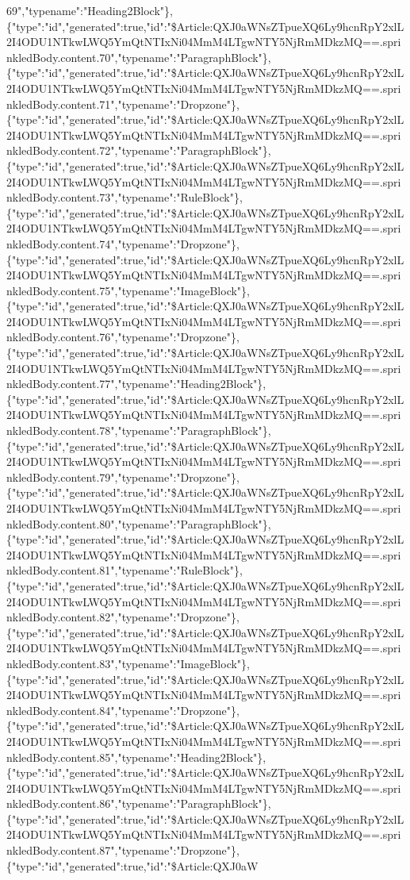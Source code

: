 69","typename":"Heading2Block"\},\{"type":"id","generated":true,"id":"\$Article:QXJ0aWNsZTpueXQ6Ly9hcnRpY2xlL2I4ODU1NTkwLWQ5YmQtNTIxNi04MmM4LTgwNTY5NjRmMDkzMQ==.sprinkledBody.content.70","typename":"ParagraphBlock"\},\{"type":"id","generated":true,"id":"\$Article:QXJ0aWNsZTpueXQ6Ly9hcnRpY2xlL2I4ODU1NTkwLWQ5YmQtNTIxNi04MmM4LTgwNTY5NjRmMDkzMQ==.sprinkledBody.content.71","typename":"Dropzone"\},\{"type":"id","generated":true,"id":"\$Article:QXJ0aWNsZTpueXQ6Ly9hcnRpY2xlL2I4ODU1NTkwLWQ5YmQtNTIxNi04MmM4LTgwNTY5NjRmMDkzMQ==.sprinkledBody.content.72","typename":"ParagraphBlock"\},\{"type":"id","generated":true,"id":"\$Article:QXJ0aWNsZTpueXQ6Ly9hcnRpY2xlL2I4ODU1NTkwLWQ5YmQtNTIxNi04MmM4LTgwNTY5NjRmMDkzMQ==.sprinkledBody.content.73","typename":"RuleBlock"\},\{"type":"id","generated":true,"id":"\$Article:QXJ0aWNsZTpueXQ6Ly9hcnRpY2xlL2I4ODU1NTkwLWQ5YmQtNTIxNi04MmM4LTgwNTY5NjRmMDkzMQ==.sprinkledBody.content.74","typename":"Dropzone"\},\{"type":"id","generated":true,"id":"\$Article:QXJ0aWNsZTpueXQ6Ly9hcnRpY2xlL2I4ODU1NTkwLWQ5YmQtNTIxNi04MmM4LTgwNTY5NjRmMDkzMQ==.sprinkledBody.content.75","typename":"ImageBlock"\},\{"type":"id","generated":true,"id":"\$Article:QXJ0aWNsZTpueXQ6Ly9hcnRpY2xlL2I4ODU1NTkwLWQ5YmQtNTIxNi04MmM4LTgwNTY5NjRmMDkzMQ==.sprinkledBody.content.76","typename":"Dropzone"\},\{"type":"id","generated":true,"id":"\$Article:QXJ0aWNsZTpueXQ6Ly9hcnRpY2xlL2I4ODU1NTkwLWQ5YmQtNTIxNi04MmM4LTgwNTY5NjRmMDkzMQ==.sprinkledBody.content.77","typename":"Heading2Block"\},\{"type":"id","generated":true,"id":"\$Article:QXJ0aWNsZTpueXQ6Ly9hcnRpY2xlL2I4ODU1NTkwLWQ5YmQtNTIxNi04MmM4LTgwNTY5NjRmMDkzMQ==.sprinkledBody.content.78","typename":"ParagraphBlock"\},\{"type":"id","generated":true,"id":"\$Article:QXJ0aWNsZTpueXQ6Ly9hcnRpY2xlL2I4ODU1NTkwLWQ5YmQtNTIxNi04MmM4LTgwNTY5NjRmMDkzMQ==.sprinkledBody.content.79","typename":"Dropzone"\},\{"type":"id","generated":true,"id":"\$Article:QXJ0aWNsZTpueXQ6Ly9hcnRpY2xlL2I4ODU1NTkwLWQ5YmQtNTIxNi04MmM4LTgwNTY5NjRmMDkzMQ==.sprinkledBody.content.80","typename":"ParagraphBlock"\},\{"type":"id","generated":true,"id":"\$Article:QXJ0aWNsZTpueXQ6Ly9hcnRpY2xlL2I4ODU1NTkwLWQ5YmQtNTIxNi04MmM4LTgwNTY5NjRmMDkzMQ==.sprinkledBody.content.81","typename":"RuleBlock"\},\{"type":"id","generated":true,"id":"\$Article:QXJ0aWNsZTpueXQ6Ly9hcnRpY2xlL2I4ODU1NTkwLWQ5YmQtNTIxNi04MmM4LTgwNTY5NjRmMDkzMQ==.sprinkledBody.content.82","typename":"Dropzone"\},\{"type":"id","generated":true,"id":"\$Article:QXJ0aWNsZTpueXQ6Ly9hcnRpY2xlL2I4ODU1NTkwLWQ5YmQtNTIxNi04MmM4LTgwNTY5NjRmMDkzMQ==.sprinkledBody.content.83","typename":"ImageBlock"\},\{"type":"id","generated":true,"id":"\$Article:QXJ0aWNsZTpueXQ6Ly9hcnRpY2xlL2I4ODU1NTkwLWQ5YmQtNTIxNi04MmM4LTgwNTY5NjRmMDkzMQ==.sprinkledBody.content.84","typename":"Dropzone"\},\{"type":"id","generated":true,"id":"\$Article:QXJ0aWNsZTpueXQ6Ly9hcnRpY2xlL2I4ODU1NTkwLWQ5YmQtNTIxNi04MmM4LTgwNTY5NjRmMDkzMQ==.sprinkledBody.content.85","typename":"Heading2Block"\},\{"type":"id","generated":true,"id":"\$Article:QXJ0aWNsZTpueXQ6Ly9hcnRpY2xlL2I4ODU1NTkwLWQ5YmQtNTIxNi04MmM4LTgwNTY5NjRmMDkzMQ==.sprinkledBody.content.86","typename":"ParagraphBlock"\},\{"type":"id","generated":true,"id":"\$Article:QXJ0aWNsZTpueXQ6Ly9hcnRpY2xlL2I4ODU1NTkwLWQ5YmQtNTIxNi04MmM4LTgwNTY5NjRmMDkzMQ==.sprinkledBody.content.87","typename":"Dropzone"\},\{"type":"id","generated":true,"id":"\$Article:QXJ0aW